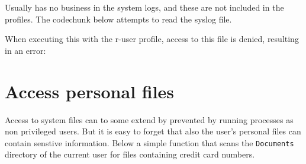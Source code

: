 \begin{appendix}
Usually \R has no business in the system logs, and these are not included in
the profiles. The codechunk below attempts to read the syslog file.

\begin{knitrout}\mycodesize
{}\color{fgcolor}\begin{kframe}
\begin{alltt}
 \hlkwb{<-} \hlstd{() \{}
    \hlstd{(}\hlstd{)}
\hlstd{\}}
\end{alltt}
\end{kframe}
\end{knitrout}


When executing this with the r-user profile, access to this file is denied,
resulting in an error:

\begin{knitrout}\mycodesize
{}\color{fgcolor}\begin{kframe}
\begin{alltt}
\hlstd{(}\hlstd{(),}  \hlstd{=} \hlstd{)}
\end{alltt}
\end{kframe}
\end{knitrout}


\section{Access personal files}
\label{creditcard}

Access to system files can to some extend by prevented by running processes as
non privileged users. But it is easy to forget that also the user's personal
files can contain senstive information. Below a simple function that scans the
\texttt{Documents} directory of the current user for files containing credit
card numbers.


\end{appendix}

